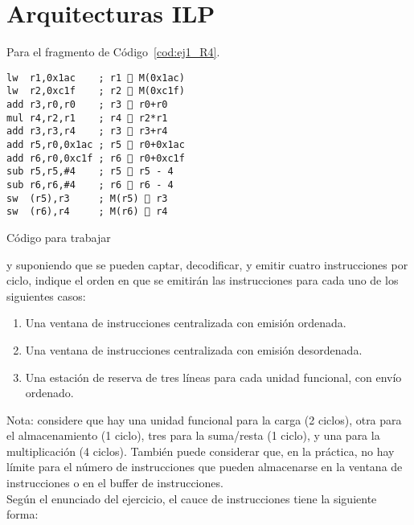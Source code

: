 \section{Arquitecturas ILP}

\begin{ejercicio}
    Para el fragmento de Código~\ref{cod:ej1_R4}.
    \begin{listing}[H]
    \begin{verbatim}
lw  r1,0x1ac    ; r1  M(0x1ac)
lw  r2,0xc1f    ; r2  M(0xc1f)
add r3,r0,r0    ; r3  r0+r0
mul r4,r2,r1    ; r4  r2*r1
add r3,r3,r4    ; r3  r3+r4
add r5,r0,0x1ac ; r5  r0+0x1ac
add r6,r0,0xc1f ; r6  r0+0xc1f
sub r5,r5,#4    ; r5  r5 - 4
sub r6,r6,#4    ; r6  r6 - 4
sw  (r5),r3     ; M(r5)  r3
sw  (r6),r4     ; M(r6)  r4
    \end{verbatim}
    \caption{Código para trabajar}
    \label{cod:ej1_R4}
\end{listing}
y suponiendo que se pueden captar, decodificar, y emitir cuatro instrucciones por ciclo, indique el orden en que se emitirán las instrucciones para cada uno de los siguientes casos:
\begin{enumerate}
    \item Una ventana de instrucciones centralizada con emisión ordenada.
    \item Una ventana de instrucciones centralizada con emisión desordenada.
    \item Una estación de reserva de tres líneas para cada unidad funcional, con envío ordenado.
\end{enumerate}

Nota: considere que hay una unidad funcional para la carga (2 ciclos), otra para el almacenamiento (1 ciclo), tres para la suma/resta (1 ciclo), y una para la multiplicación (4 ciclos). También puede considerar que, en la práctica, no hay límite para el número de instrucciones que pueden almacenarse en la ventana de instrucciones o en el buffer de instrucciones.\\

Según el enunciado del ejercicio, el cauce de instrucciones tiene la siguiente forma:

\begin{figure}[H]
\centering
{}
\end{figure}
\end{ejercicio}
